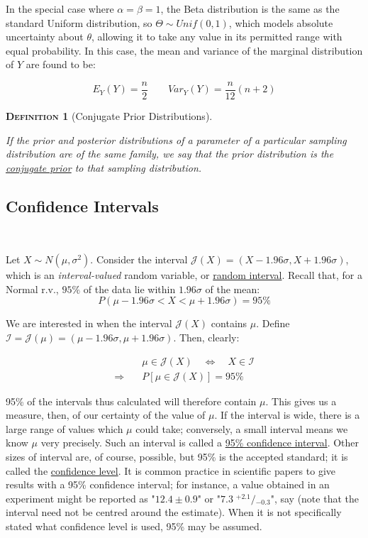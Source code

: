 \documentclass[12pt,a4paper]{article}
\newtheorem{definition}{\textsc{Definition}}[section]
\begin{document}
In the special case where $\alpha = \beta = 1$, the Beta distribution is the same as the standard Uniform distribution, so $\Theta \sim Unif(0,1)$, which models absolute uncertainty about $\theta$, allowing it to take any value in its permitted range with equal probability. In this case, the mean and variance of the marginal distribution of $Y$ are found to be:

$$E_Y(Y) = \frac{n}{2} \qquad Var_Y(Y) = \frac{n}{12}(n+2)$$

\begin{definition}[Conjugate Prior Distributions]$\;$\par\vspace{1cm}

If the prior and posterior distributions of a parameter of a particular sampling distribution are of the same family, we say that the prior distribution is the \underline{conjugate prior} to that sampling distribution.

\end{definition}

\subsection{Confidence Intervals}$\;$

Let $X \sim N(\mu,\sigma^2)$. Consider the interval $\mathscr{J}(X) = (X-1.96\sigma,X+1.96\sigma)$, which is an \emph{interval-valued} random variable, or \underline{random interval}. Recall that, for a Normal r.v., $95\%$ of the data lie within $1.96\sigma$ of the mean:
$$P(\mu-1.96\sigma < X < \mu+1.96\sigma) = 95\%$$

We are interested in when the interval $\mathscr{J}(X)$ contains $\mu$. Define $\mathcal{I}=\mathscr{J}(\mu) = (\mu-1.96\sigma,\mu+1.96\sigma)$. Then, clearly:

\begin{align*}
&\mu \in \mathscr{J}(X) \quad \Leftrightarrow\quad X \in \mathcal{I}\\
\Rightarrow\quad &P[\mu\in \mathscr{J}(X)] = 95\%
\end{align*}

95\% of the intervals thus calculated will therefore contain $\mu$. This gives us a measure, then, of our certainty of the value of $\mu$. If the interval is wide, there is a large range of values which $\mu$ could take; conversely, a small interval means we know $\mu$ very precisely. Such an interval is called a \underline{95\% confidence interval}. Other sizes of interval are, of course, possible, but 95\% is the accepted standard; it is called the \underline{confidence level}. It is common practice in scientific papers to give results with a 95\% confidence interval; for instance, a value obtained in an experiment might be reported as "$12.4 \pm 0.9$" or "$7.3\; {}^{+2.1}\!\!/\!\!{}_{-0.3}$", say (note that the interval need not be centred around the estimate). When it is not specifically stated what confidence level is used, 95\% may be assumed.
\end{document}
